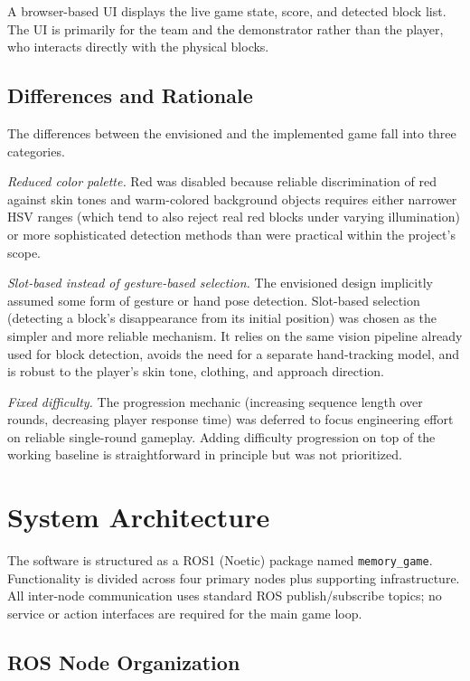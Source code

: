 \documentclass[conference]{IEEEtran}
\begin{document}
A browser-based UI displays the live game state, score, and detected
block list. The UI is primarily for the team and the demonstrator
rather than the player, who interacts directly with the physical
blocks.

\subsection{Differences and Rationale}

The differences between the envisioned and the implemented game fall
into three categories.

\textit{Reduced color palette.} Red was disabled because reliable
discrimination of red against skin tones and warm-colored background
objects requires either narrower HSV ranges (which tend to also reject
real red blocks under varying illumination) or more sophisticated
detection methods than were practical within the project's scope.

\textit{Slot-based instead of gesture-based selection.} The envisioned
design implicitly assumed some form of gesture or hand pose detection.
Slot-based selection (detecting a block's disappearance from its initial
position) was chosen as the simpler and more reliable mechanism. It
relies on the same vision pipeline already used for block detection,
avoids the need for a separate hand-tracking model, and is robust to
the player's skin tone, clothing, and approach direction.

\textit{Fixed difficulty.} The progression mechanic (increasing sequence
length over rounds, decreasing player response time) was deferred to
focus engineering effort on reliable single-round gameplay. Adding
difficulty progression on top of the working baseline is straightforward
in principle but was not prioritized.

\section{System Architecture}
\label{sec:arch}

The software is structured as a ROS1 (Noetic) package named
\texttt{memory\_game}. Functionality is divided across four primary
nodes plus supporting infrastructure. All inter-node communication uses
standard ROS publish/subscribe topics; no service or action interfaces
are required for the main game loop.

\subsection{ROS Node Organization}
\end{document}
